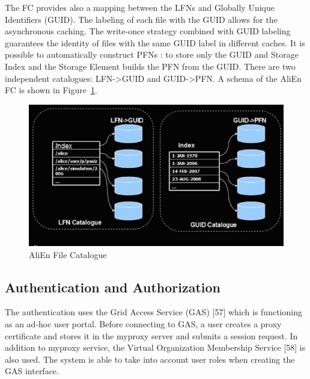 \documentclass{intech}
\begin{document}
The FC provides also a mapping between the LFNs and Globally Unique
Identifiers (GUID). The labeling of each file with the GUID allows
for the asynchronous caching. The write-once strategy combined with
GUID labeling guarantees the identity of files with the same GUID
label in different caches. It is possible to automatically construct
PFNs : to store only the GUID and Storage Index and the Storage
Element builds the PFN from the GUID. There are two independent
catalogues: LFN->GUID and GUID->PFN. A schema of the AliEn FC is
shown in Figure~\ref{fig15}.

\begin{figure}[htb] %
\centering
\includegraphics[width=13cm]{fig15.eps} %
\caption{AliEn File Catalogue}\label{fig15}
\end{figure}


\subsection{Authentication and Authorization}
%
The authentication uses the Grid Access Service (GAS) [57] which is
functioning as an ad-hoc user portal. Before connecting to GAS, a
user creates a proxy certificate and stores it in the myproxy server
and submits a session request. In addition to myproxy service, the
Virtual Organization Membership Service [58] is also used. The system
is able to take into account user roles when creating the GAS
interface.
\end{document}
